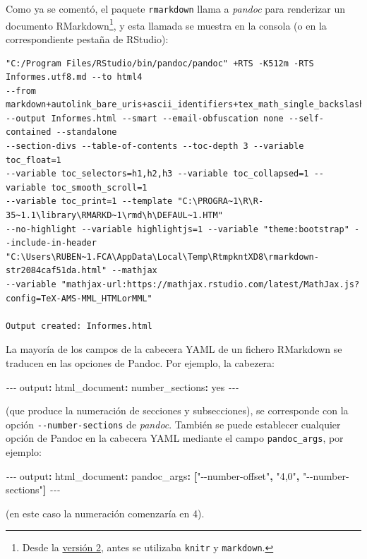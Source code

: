 \documentclass[
]{book}
\newenvironment{Shaded}{\begin{snugshade}}{\end{snugshade}}
\newcommand{\AttributeTok}[1]{\textcolor[rgb]{0.77,0.63,0.00}{#1}}
\newcommand{\CharTok}[1]{\textcolor[rgb]{0.31,0.60,0.02}{#1}}
\newcommand{\FunctionTok}[1]{\textcolor[rgb]{0.00,0.00,0.00}{#1}}
\newcommand{\KeywordTok}[1]{\textcolor[rgb]{0.13,0.29,0.53}{\textbf{#1}}}
\newcommand{\PreprocessorTok}[1]{\textcolor[rgb]{0.56,0.35,0.01}{\textit{#1}}}
\newcommand{\StringTok}[1]{\textcolor[rgb]{0.31,0.60,0.02}{#1}}
\theoremstyle{break}
\theoremstyle{nonumberplain}
\begin{document}
Como ya se comentó, el paquete \texttt{rmarkdown} llama a \emph{pandoc} para renderizar un documento RMarkdown\footnote{Desde la \href{https://blog.rstudio.org/2014/06/18/r-markdown-v2/}{versión 2}, antes se utilizaba \texttt{knitr} y \texttt{markdown}.}, y esta llamada se muestra en la consola (o en la correspondiente pestaña de RStudio):

\begin{verbatim}
"C:/Program Files/RStudio/bin/pandoc/pandoc" +RTS -K512m -RTS Informes.utf8.md --to html4 
--from markdown+autolink_bare_uris+ascii_identifiers+tex_math_single_backslash 
--output Informes.html --smart --email-obfuscation none --self-contained --standalone 
--section-divs --table-of-contents --toc-depth 3 --variable toc_float=1 
--variable toc_selectors=h1,h2,h3 --variable toc_collapsed=1 --variable toc_smooth_scroll=1 
--variable toc_print=1 --template "C:\PROGRA~1\R\R-35~1.1\library\RMARKD~1\rmd\h\DEFAUL~1.HTM"
--no-highlight --variable highlightjs=1 --variable "theme:bootstrap" --include-in-header
"C:\Users\RUBEN~1.FCA\AppData\Local\Temp\RtmpkntXD8\rmarkdown-str2084caf51da.html" --mathjax 
--variable "mathjax-url:https://mathjax.rstudio.com/latest/MathJax.js?config=TeX-AMS-MML_HTMLorMML"

Output created: Informes.html
\end{verbatim}

La mayoría de los campos de la cabecera YAML de un fichero RMarkdown se traducen en las opciones de Pandoc.
Por ejemplo, la cabezera:

\begin{Shaded}
\begin{Highlighting}[]
\PreprocessorTok{{-}{-}{-}}
\FunctionTok{output}\KeywordTok{:}
\AttributeTok{  }\FunctionTok{html\_document}\KeywordTok{:}
\AttributeTok{    }\FunctionTok{number\_sections}\KeywordTok{:}\AttributeTok{ }\CharTok{yes}\AttributeTok{      }
\PreprocessorTok{{-}{-}{-}}
\end{Highlighting}
\end{Shaded}

(que produce la numeración de secciones y subsecciones),
se corresponde con la opción \texttt{-\/-number-sections} de \emph{pandoc}.
También se puede establecer cualquier opción de Pandoc en la cabecera YAML
mediante el campo \texttt{pandoc\_args}, por ejemplo:

\begin{Shaded}
\begin{Highlighting}[]
\PreprocessorTok{{-}{-}{-}}
\FunctionTok{output}\KeywordTok{:}
\AttributeTok{  }\FunctionTok{html\_document}\KeywordTok{:}\AttributeTok{ }
\AttributeTok{    }\FunctionTok{pandoc\_args}\KeywordTok{:}\AttributeTok{ }\KeywordTok{[}\StringTok{"{-}{-}number{-}offset"}\KeywordTok{,}\AttributeTok{ }\StringTok{"4,0"}\KeywordTok{,}\AttributeTok{ }\StringTok{"{-}{-}number{-}sections"}\KeywordTok{]}\AttributeTok{      }
\PreprocessorTok{{-}{-}{-}}
\end{Highlighting}
\end{Shaded}

(en este caso la numeración comenzaría en 4).

  
\end{document}
